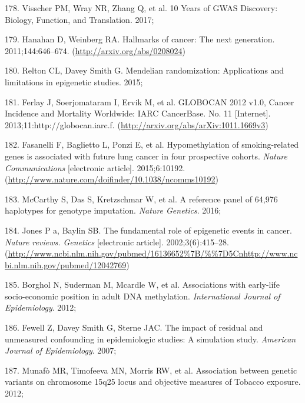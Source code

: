 \documentclass[11pt,oneside]{bristolthesis}
\newenvironment{cslreferences}%
  {}%
  {\par}
\begin{document}
\begin{cslreferences}
\leavevmode\hypertarget{ref-Visscher2017}{}%
178. Visscher PM, Wray NR, Zhang Q, et al. 10 Years of GWAS Discovery: Biology, Function, and Translation. 2017;

\leavevmode\hypertarget{ref-Hanahan2011}{}%
179. Hanahan D, Weinberg RA. Hallmarks of cancer: The next generation. 2011;144:646--674. (\url{http://arxiv.org/abs/0208024})

\leavevmode\hypertarget{ref-Relton2015}{}%
180. Relton CL, Davey Smith G. Mendelian randomization: Applications and limitations in epigenetic studies. 2015;

\leavevmode\hypertarget{ref-Ferlay2013}{}%
181. Ferlay J, Soerjomataram I, Ervik M, et al. GLOBOCAN 2012 v1.0, Cancer Incidence and Mortality Worldwide: IARC CancerBase. No. 11 {[}Internet{]}. 2013;11:http://globocan.iarc.f. (\url{http://arxiv.org/abs/arXiv:1011.1669v3})

\leavevmode\hypertarget{ref-Fasanelli2015}{}%
182. Fasanelli F, Baglietto L, Ponzi E, et al. Hypomethylation of smoking-related genes is associated with future lung cancer in four prospective cohorts. \emph{Nature Communications} {[}electronic article{]}. 2015;6:10192. (\url{http://www.nature.com/doifinder/10.1038/ncomms10192})

\leavevmode\hypertarget{ref-McCarthy2016}{}%
183. McCarthy S, Das S, Kretzschmar W, et al. A reference panel of 64,976 haplotypes for genotype imputation. \emph{Nature Genetics}. 2016;

\leavevmode\hypertarget{ref-Jones2002}{}%
184. Jones P a, Baylin SB. The fundamental role of epigenetic events in cancer. \emph{Nature reviews. Genetics} {[}electronic article{]}. 2002;3(6):415--28. (\url{http://www.ncbi.nlm.nih.gov/pubmed/16136652\%7B/\%\%7D5Cnhttp://www.ncbi.nlm.nih.gov/pubmed/12042769})

\leavevmode\hypertarget{ref-Borghol2012}{}%
185. Borghol N, Suderman M, Mcardle W, et al. Associations with early-life socio-economic position in adult DNA methylation. \emph{International Journal of Epidemiology}. 2012;

\leavevmode\hypertarget{ref-Fewell2007}{}%
186. Fewell Z, Davey Smith G, Sterne JAC. The impact of residual and unmeasured confounding in epidemiologic studies: A simulation study. \emph{American Journal of Epidemiology}. 2007;

\leavevmode\hypertarget{ref-Munafo2012}{}%
187. Munafò MR, Timofeeva MN, Morris RW, et al. Association between genetic variants on chromosome 15q25 locus and objective measures of Tobacco exposure. 2012;


\end{cslreferences}
\end{document}
